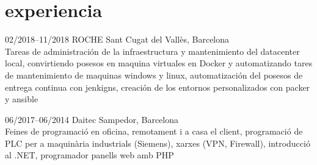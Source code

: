 \documentclass[]{cv-style}          %
\begin{document}




\section{experiencia}


\begin{entrylist}
\entry
  {02/2018--11/2018}
  {ROCHE}
  {Sant Cugat del Vallès, Barcelona}
  {\\
  Tareas de administración de la infraestructura y mantenimiento del datacenter local, convirtiendo posesos en maquina virtuales en Docker y automatizando tares de mantenimiento de maquinas windows y linux, automatización del posesos de entrega continua con jenkigns, creación de los entornos personalizados con packer y ansible
  }
  
\entry
  {06/2017--06/2014}
  {Daitec}
  {Sampedor, Barcelona}
  {\\
  Feines de programació en oficina, remotament i a casa el client, programació de PLC per a maquinària industrials (Siemens), xarxes (VPN, Firewall), introducció al .NET, programador panells web amb PHP}


\end{entrylist}
\end{document}

